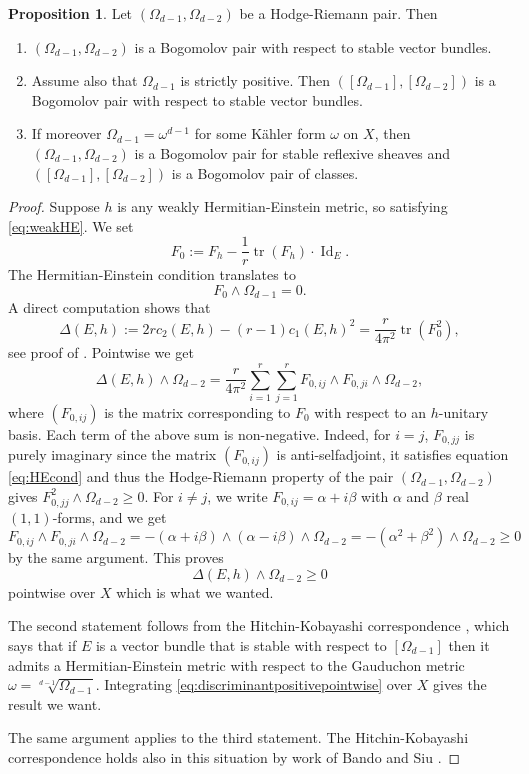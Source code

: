 \documentclass[a4,reqno]{amsart}
\theoremstyle{definition}
\newtheorem{proposition}[theorem]{Proposition}
\DeclareMathOperator{\Id}{Id}
\DeclareMathOperator{\tr}{tr}
\numberwithin{equation}{section}
\begin{document}
\begin{proposition}\label{prop:Bogomolov-HRpairs}
Let $(\Omega_{d-1},\Omega_{d-2})$ be a Hodge-Riemann pair.  Then
\begin{enumerate}
\item $(\Omega_{d-1},\Omega_{d-2})$ is a Bogomolov pair with respect to stable vector bundles.
\item Assume also that $\Omega_{d-1}$ is  strictly  positive.  Then $([\Omega_{d-1}],[\Omega_{d-2}])$ is a Bogomolov pair with respect to stable vector bundles. 
\item If moreover $\Omega_{d-1}=\omega^{d-1}$ for some K\"ahler form $\omega$ on $X$, then
 $(\Omega_{d-1},\Omega_{d-2})$ is a Bogomolov pair for stable reflexive sheaves and
$([\Omega_{d-1}],[\Omega_{d-2}])$ is a Bogomolov pair of classes.
\end{enumerate}
\end{proposition}
\begin{proof}


Suppose $h$ is any weakly Hermitian-Einstein metric, so satisfying \eqref{eq:weakHE}.  We set 
\[
    F_0 := F_h - \frac{1}{r}\tr(F_h)\cdot \Id_E.
\]
The Hermitian-Einstein condition translates to
\begin{equation}\label{eq:HEcond}
     F_0 \wedge \Omega_{d-1} = 0.
\end{equation}
A direct computation shows that
\[
    \Delta(E,h) :=2r c_2(E,h)  - (r-1) c_1(E,h)^2= \frac{r}{4\pi^2}\tr(F_0^2),
\]
see proof of \cite[Theorem 2.2.3]{LuTe}. Pointwise we get
\[
    \Delta(E,h) \wedge \Omega_{d-2} = \frac{r}{4\pi^2} \sum_{i=1}^r\sum_{j=1}^r F_{0,ij} \wedge F_{0,ji} \wedge \Omega_{d-2},
\]
where $(F_{0,ij})$ is the matrix corresponding to $F_0$ with respect to an $h$-unitary basis. Each term of the above sum is non-negative. Indeed, for $i = j$, $F_{0,jj}$ is purely imaginary since the matrix $(F_{0,ij})$ is anti-selfadjoint, it satisfies equation \eqref{eq:HEcond} and thus the Hodge-Riemann property of the pair $(\Omega_{d-1},\Omega_{d-2})$ gives $F_{0,jj}^2 \wedge \Omega_{d-2} \ge 0$. For $i \neq j$, we write $F_{0,ij} = \alpha + i\beta$ with $\alpha$ and $\beta$ real $(1,1)$-forms, and we get
\[
    F_{0,ij} \wedge F_{0,ji} \wedge \Omega_{d-2} = -(\alpha + i\beta) \wedge (\alpha - i\beta) \wedge \Omega_{d-2} = -(\alpha^2 + \beta^2) \wedge \Omega_{d-2} \ge 0
\]
by the same argument.  This proves 
\begin{equation}\Delta(E,h)\wedge \Omega_{d-2}\ge 0\label{eq:discriminantpositivepointwise}
\end{equation}
pointwise over $X$ which is what we wanted.


The second statement follows from the Hitchin-Kobayashi correspondence \cite{LiYau}, which says that if $E$ is a vector bundle that is stable with respect to $[\Omega_{d-1}]$ then it admits a Hermitian-Einstein metric with respect to the Gauduchon metric $\omega= \sqrt[d-1]{\Omega_{d-1}}$. Integrating \eqref{eq:discriminantpositivepointwise} over $X$ gives the result we want.

The same argument applies to the third statement. The Hitchin-Kobayashi correspondence holds also in this situation by work of Bando and Siu \cite{BandoSiu}.
\end{proof}
\end{document}
